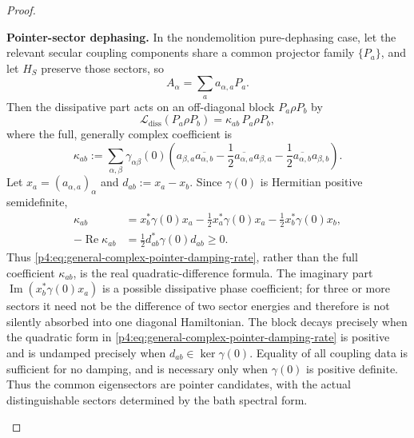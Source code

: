 \documentclass[12pt,a4paper]{article}
\begin{document}
\begin{proof}
\begin{proofsteps}
\item \textbf{Pointer-sector dephasing.}
In the nondemolition pure-dephasing case, let the relevant secular coupling components share a common projector family \(\{P_a\}\), and let \(H_S\) preserve those sectors, so
\[
A_\alpha=\sum_a a_{\alpha,a}P_a.
\]
Then the dissipative part acts on an off-diagonal block \(P_a\rho P_b\) by
\begin{equation}
\label{p4:eq:general-complex-pointer-coefficient}
 \mathcal L_{\mathrm{diss}}(P_a\rho P_b)
 =\kappa_{ab}\,P_a\rho P_b,
\end{equation}
where the full, generally complex coefficient is
\begin{equation}
\label{p4:eq:general-complex-pointer-kappa}
 \kappa_{ab}
 :=
 \sum_{\alpha,\beta}\gamma_{\alpha\beta}(0)
 \left(
 a_{\beta,a}\overline{a_{\alpha,b}}
 -\frac12\overline{a_{\alpha,a}}a_{\beta,a}
 -\frac12\overline{a_{\alpha,b}}a_{\beta,b}
 \right).
\end{equation}
Let \(x_a=(a_{\alpha,a})_\alpha\) and
\(d_{ab}:=x_a-x_b\).  Since \(\gamma(0)\) is Hermitian positive
semidefinite,
\begin{align}
 \kappa_{ab}
 &=x_b^*\gamma(0)x_a
 -\frac12x_a^*\gamma(0)x_a
 -\frac12x_b^*\gamma(0)x_b,
 \label{p4:eq:general-complex-pointer-vector-form}\\
 -\operatorname{Re}\kappa_{ab}
 &=\frac12d_{ab}^*\gamma(0)d_{ab}\ge0.
 \label{p4:eq:general-complex-pointer-damping-rate}
\end{align}
Thus \eqref{p4:eq:general-complex-pointer-damping-rate}, rather than the
full coefficient \(\kappa_{ab}\), is the real quadratic-difference formula.
The imaginary part
\(\operatorname{Im}(x_b^*\gamma(0)x_a)\) is a possible dissipative
phase coefficient; for three or more sectors it need not be the difference
of two sector energies and therefore is not silently absorbed into one
diagonal Hamiltonian.  The block decays precisely when the quadratic form in
\eqref{p4:eq:general-complex-pointer-damping-rate} is positive and is
undamped precisely when \(d_{ab}\in\ker\gamma(0)\).  Equality of all
coupling data is sufficient for no damping, and is necessary only when
\(\gamma(0)\) is positive definite.  Thus the common eigensectors are
pointer candidates, with the actual distinguishable sectors determined by
the bath spectral form.



\end{proofsteps}
\end{proof}
\end{document}
